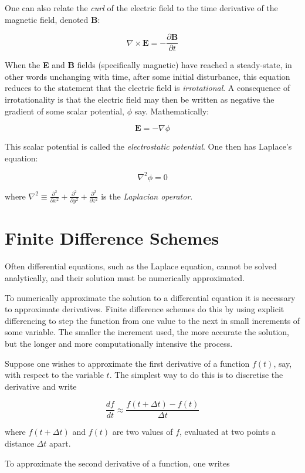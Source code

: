 \documentclass{article}
\newcommand{\be}{\begin{equation}}
\newcommand{\ee}{\end{equation}}
\begin{document}
One can also relate the \emph{curl} of the electric field to the time
derivative of the magnetic field, denoted \textbf{B}:

\be
\nabla \times \bm{E} = - \frac{\partial \bm{B}}{\partial t}
\ee

When the \textbf{E} and \textbf{B} fields (specifically magnetic) have reached
a steady-state, in other words unchanging with time, after some initial disturbance,
this equation reduces to the statement that the electric field is \emph{irrotational}.
A consequence of irrotationality is that the electric field may then be written as negative
the gradient of some scalar potential, $\phi$ say. Mathematically:

\be
\bm{E} = -\nabla \phi
\ee

This scalar potential is called the \emph{electrostatic potential}.
One then has Laplace's equation:

\be
\nabla^2 \phi = 0
\ee

where
$\nabla^2 \equiv \frac{\partial^2}{\partial x^2}+\frac{\partial^2}{\partial y^2}+\frac{\partial^2}{\partial z^2}$ 
is the \emph{Laplacian operator}.

\newpage

\section{Finite Difference Schemes}
Often differential equations, such as the Laplace equation, cannot be solved
analytically, and their solution must be numerically approximated.

To numerically approximate the solution to a differential equation it is
necessary to approximate derivatives. Finite difference schemes do this
by using explicit differencing to step the function from one value to the
next in small increments of some variable. The smaller the increment used,
the more accurate the solution, but the longer and more computationally
intensive the process.

Suppose one wishes to approximate the first derivative of a function $f(t)$, say,
with respect to the variable $t$. The simplest way to do this is to discretise the
derivative and write

\be
\frac{df}{dt} \approx \frac{f(t+\Delta t) - f(t)}{\Delta t}
\ee

where $f(t+\Delta t)$ and $f(t)$ are two values of $f$, evaluated at two points
a distance $\Delta t$ apart.

To approximate the second derivative of a function, one writes
\end{document}
